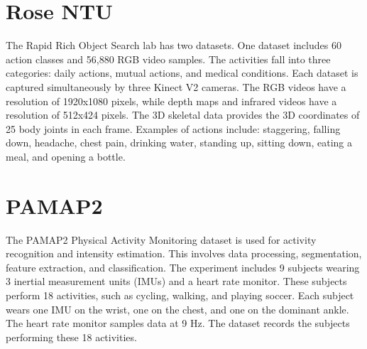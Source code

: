 \section{Rose NTU}
The Rapid Rich Object Search lab has two datasets. One dataset includes 60 action classes and 56,880 RGB video samples. The activities fall into three categories: daily actions, mutual actions, and medical conditions. Each dataset is captured simultaneously by three Kinect V2 cameras. The RGB videos have a resolution of 1920x1080 pixels, while depth maps and infrared videos have a resolution of 512x424 pixels. The 3D skeletal data provides the 3D coordinates of 25 body joints in each frame. Examples of actions include: staggering, falling down, headache, chest pain, drinking water, standing up, sitting down, eating a meal, and opening a bottle.

\section{PAMAP2}
The PAMAP2 Physical Activity Monitoring \parencite{pamap} dataset is used for activity recognition and intensity estimation. This involves data processing, segmentation, feature extraction, and classification. The experiment includes 9 subjects wearing 3 inertial measurement units (IMUs) and a heart rate monitor. These subjects perform 18 activities, such as cycling, walking, and playing soccer. Each subject wears one IMU on the wrist, one on the chest, and one on the dominant ankle. The heart rate monitor samples data at 9 Hz. The dataset records the subjects performing these 18 activities.
